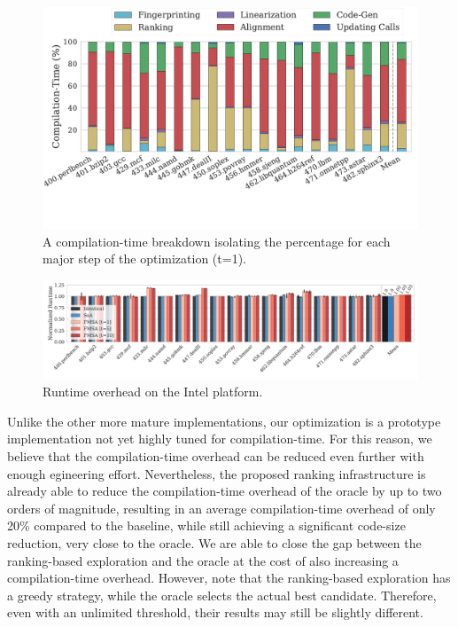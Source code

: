 \begin{figure}[t]
  \centering
  \includegraphics[width=1.0\linewidth]{figs/compilation-time-breakdown-sqrd.pdf}
  \vspace{-8.5ex}
  \caption{A compilation-time breakdown isolating the percentage for each major
           step of the optimization (t=1).}%
  \label{fig:compilation-time-breakdown}
\end{figure}

\begin{figure}[t]
  \centering
  \includegraphics[width=\linewidth]{figs/runtime-impact.pdf}
  \vspace{-4ex}
  \caption{Runtime overhead on the Intel platform.}
  \label{fig:runtime-impact}
\end{figure}

Unlike the other more mature implementations, our optimization is a prototype
implementation not yet highly tuned for compilation-time.
For this reason, we believe that the compilation-time overhead can be reduced
even further with enough egineering effort.
Nevertheless, the proposed ranking infrastructure is already able to reduce the
compilation-time overhead of the oracle by up to two orders of magnitude,
resulting in  an average compilation-time overhead of only 20\% compared to the
baseline, while still achieving a significant code-size reduction, very close to
the oracle.
We are able to close the gap between the ranking-based exploration and the
oracle at the cost of also increasing a compilation-time overhead.
However, note that the ranking-based exploration has a greedy strategy, while
the oracle selects the actual best candidate.
Therefore, even with an unlimited threshold, their results may still be slightly
different.

